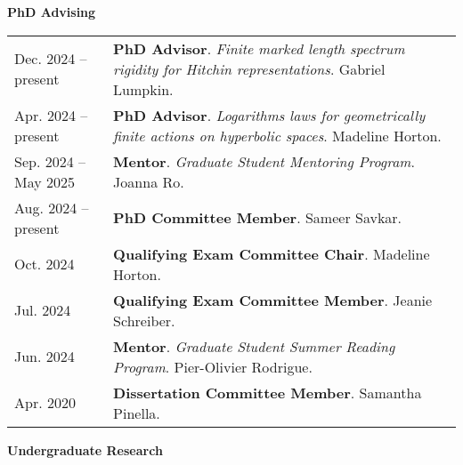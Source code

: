 
    \medskip


    \medskip
    \medskip



    \textbf{\large PhD Advising}
    
    \begin{center}
    {
    \renewcommand{\arraystretch}{1.5}
    \begin{longtable}{p{}  p{}}
     Dec.  2024 --    present & \textbf{PhD Advisor}. \textit{Finite marked length spectrum rigidity for Hitchin representations}.  Gabriel Lumpkin.  \\ 
 Apr.  2024 --    present & \textbf{PhD Advisor}. \textit{Logarithms laws for geometrically finite actions on hyperbolic spaces}.  Madeline Horton.  \\ 
 Sep.  2024 --  May  2025 & \textbf{Mentor}. \textit{Graduate Student Mentoring Program}.  Joanna Ro.  \\ 
 Aug.  2024 --    present & \textbf{PhD Committee Member}.  Sameer Savkar.  \\ 
 Oct.  2024 & \textbf{Qualifying Exam Committee Chair}.  Madeline Horton.  \\ 
 Jul.  2024 & \textbf{Qualifying Exam Committee Member}.  Jeanie Schreiber.  \\ 
 Jun.  2024 & \textbf{Mentor}. \textit{Graduate Student Summer Reading Program}.  Pier-Olivier Rodrigue.  \\ 
 Apr.  2020 & \textbf{Dissertation Committee Member}.  Samantha Pinella.  
    \end{longtable}
    } 
    \end{center}

    \vspace{-1em}
    

    \textbf{\large Undergraduate Research}
    

